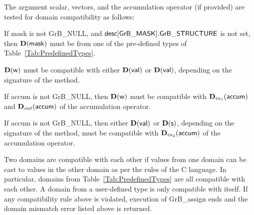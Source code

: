 The argument scalar, vectors, and the accumulation 
operator (if provided) are tested for domain compatibility as follows:
\begin{enumerate}
	\item If {\sf mask} is not {\sf GrB\_NULL}, and ${\sf desc[GrB\_MASK].GrB\_STRUCTURE}$
    is not set, then $\bold{D}({\sf mask})$ must be from one of the pre-defined types of 
    Table~\ref{Tab:PredefinedTypes}.

{\color{red}
	\item $\bold{D}({\sf w})$ must be 
    compatible with either $\bold{D}({\sf val})$ or $\bold{D}({\sf val})$, depending
	on the signature of the method.

	\item If {\sf accum} is not {\sf GrB\_NULL}, then $\bold{D}({\sf w})$ must be
    compatible with $\mbox{$\mathbf{D}_{in_{1}}$}({\sf accum})$ and $\mbox{$\mathbf{D}_{out}$}({\sf accum})$ of the accumulation operator.
	
\item If {\sf accum} is not {\sf GrB\_NULL}, then  
    either $\bold{D}({\sf val})$ or $\bold{D}({\sf s})$, depending on the signature of the method, must be compatible with $\mbox{$\mathbf{D}_{in_{2}}$}({\sf accum})$ of the accumulation operator.
}
\end{enumerate}
Two domains are compatible with each other if values from one domain can be cast 
to values in the other domain as per the rules of the C language.
In particular, domains from Table~\ref{Tab:PredefinedTypes} are all compatible 
with each other. A domain from a user-defined type is only compatible with itself.
If any compatibility rule above is violated, execution of {\sf GrB\_assign} ends
and the domain mismatch error listed above is returned.

